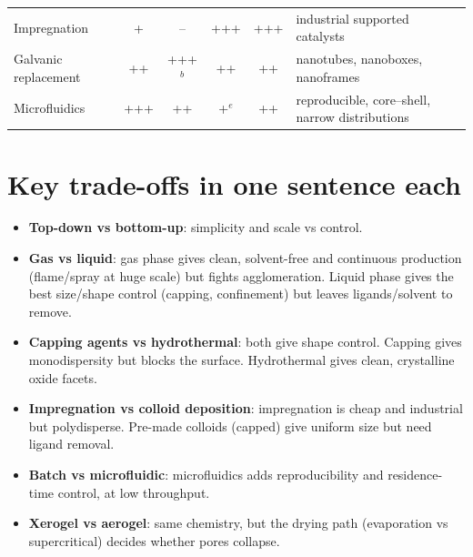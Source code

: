 \begin{center}
\begin{longtable}{@{}>{\raggedright\arraybackslash}p{2.9cm}cccc>{\raggedright\arraybackslash}p{4.9cm}@{}}
Impregnation & + & -- & +++ & +++ & industrial supported catalysts \\
Galvanic replacement & ++ & +++$^b$ & ++ & ++ & nanotubes, nanoboxes, nanoframes \\
Microfluidics & +++ & ++ & +$^e$ & ++ & reproducible, core--shell, narrow distributions \\
\bottomrule
\end{longtable}
\end{center}

\section{Key trade-offs in one sentence each}
\begin{itemize}
  \item \textbf{Top-down vs bottom-up}: simplicity and scale vs control.
  \item \textbf{Gas vs liquid}: gas phase gives clean, solvent-free and continuous production (flame/spray at huge scale) but
        fights agglomeration. Liquid phase gives the best size/shape control (capping, confinement) but leaves
        ligands/solvent to remove.
  \item \textbf{Capping agents vs hydrothermal}: both give shape control. Capping gives monodispersity but blocks the
        surface. Hydrothermal gives clean, crystalline oxide facets.
  \item \textbf{Impregnation vs colloid deposition}: impregnation is cheap and industrial but polydisperse. Pre-made
        colloids (capped) give uniform size but need ligand removal.
  \item \textbf{Batch vs microfluidic}: microfluidics adds reproducibility and residence-time control, at low throughput.
  \item \textbf{Xerogel vs aerogel}: same chemistry, but the drying path (evaporation vs supercritical) decides
        whether pores collapse.
\end{itemize}

